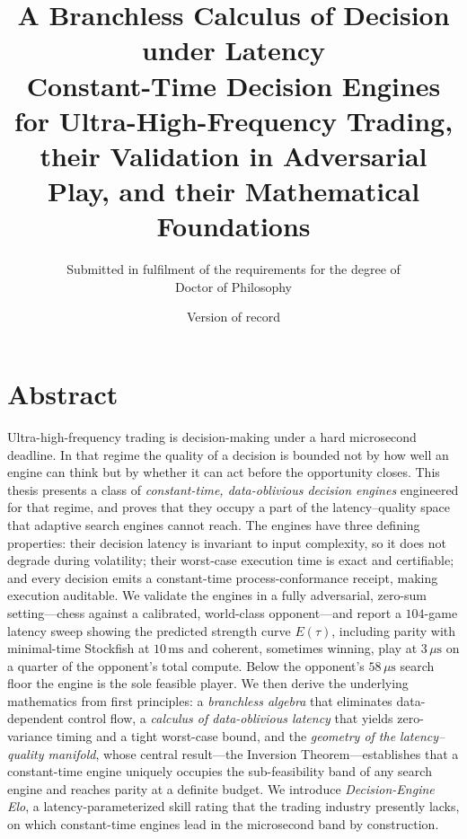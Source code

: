 \documentclass[11pt,oneside]{book}
\title{\textbf{A Branchless Calculus of Decision under Latency}\\[0.4em]
\large Constant-Time Decision Engines for Ultra-High-Frequency Trading,\\
their Validation in Adversarial Play, and their Mathematical Foundations}
\author{Submitted in fulfilment of the requirements for the degree of\\
Doctor of Philosophy}
\date{Version of record}
\theoremstyle{definition}
\theoremstyle{plain}
\theoremstyle{remark}
\newcommand{\Elo}{E}
\newcommand{\budget}{\tau}
\begin{document}
\maketitle

\chapter*{Abstract}

Ultra-high-frequency trading is decision-making under a hard microsecond deadline. In
that regime the quality of a decision is bounded not by how well an engine can think but
by whether it can act before the opportunity closes. This thesis presents a class of
\emph{constant-time, data-oblivious decision engines} engineered for that regime, and
proves that they occupy a part of the latency--quality space that adaptive search engines
cannot reach. The engines have three defining properties: their decision latency is
invariant to input complexity, so it does not degrade during volatility; their worst-case
execution time is exact and certifiable; and every decision emits a constant-time
process-conformance receipt, making execution auditable. We validate the engines in a
fully adversarial, zero-sum setting---chess against a calibrated, world-class
opponent---and report a $104$-game latency sweep showing the predicted strength curve
$\Elo(\budget)$, including parity with minimal-time Stockfish at $10\,\mathrm{ms}$ and
coherent, sometimes winning, play at $3\,\mu\mathrm{s}$ on a quarter of the opponent's
total compute. Below the opponent's $58\,\mu\mathrm{s}$ search floor the engine is the
sole feasible player. We then derive the underlying mathematics from first principles: a
\emph{branchless algebra} that eliminates data-dependent control flow, a \emph{calculus of
data-oblivious latency} that yields zero-variance timing and a tight worst-case bound, and
the \emph{geometry of the latency--quality manifold}, whose central result---the Inversion
Theorem---establishes that a constant-time engine uniquely occupies the sub-feasibility
band of any search engine and reaches parity at a definite budget. We introduce
\emph{Decision-Engine Elo}, a latency-parameterized skill rating that the trading industry
presently lacks, on which constant-time engines lead in the microsecond band by
construction.

\tableofcontents

\end{document}
